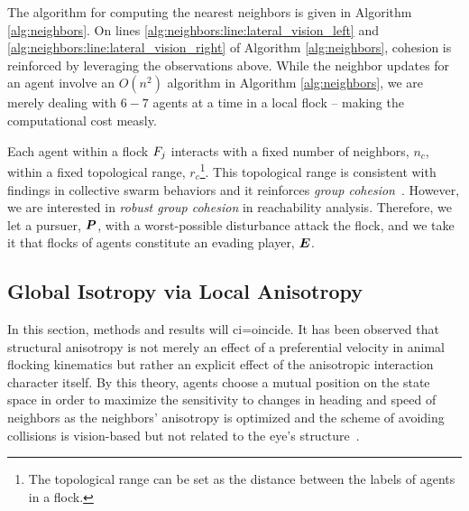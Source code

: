 %
The algorithm for computing the nearest neighbors is given in Algorithm \autoref{alg:neighbors}. On lines \autoref{alg:neighbors:line:lateral_vision_left} and \autoref{alg:neighbors:line:lateral_vision_right} of Algorithm \autoref{alg:neighbors}, cohesion is reinforced by leveraging the observations above. While the neighbor updates for an agent involve an $O(n^2)$ algorithm in Algorithm \ref{alg:neighbors}, we are merely dealing with $6-7$ agents at a time in a local flock -- making the computational cost measly.

Each agent within a flock $F_j$ interacts with a fixed number of neighbors, $n_c$, within a fixed topological range, $r_c$\footnote{The topological range can be set as the distance between the labels of agents in a flock.}. This topological range %
is consistent with findings in collective swarm behaviors and it reinforces \textit{group cohesion}~\cite{Ballerini1232}. However, we are interested in \textit{robust group cohesion} in reachability analysis. Therefore, we let a pursuer, $\bm{P}$, with a worst-possible disturbance attack the flock, and we take it that flocks of agents constitute an evading player, $\bm{E}$. 

\subsection{Global Isotropy via Local Anisotropy}
%
In this section, methods and results will ci=oincide. It has been observed that structural anisotropy is not merely an effect of a preferential velocity in animal flocking kinematics but rather an explicit effect of the anisotropic interaction character itself. By this theory, agents choose a mutual position on the state space in order to maximize the sensitivity to changes in heading and speed of neighbors as the neighbors' anisotropy is optimized and the scheme of avoiding collisions  is vision-based but not related to the eye's structure~\cite{Ballerini1232}.
 
